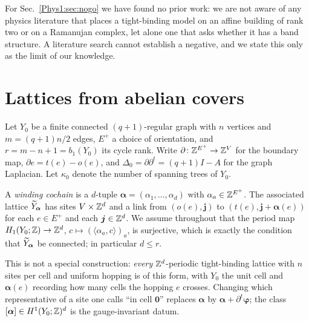 For Sec.~\ref{Phys1:sec:nogo} we have found no prior work: we are not aware of any physics
literature that places a tight-binding model on an affine building of rank two or on a
Ramanujan complex, let alone one that asks whether it has a band structure. A literature
search cannot establish a negative, and we state this only as the limit of our knowledge.

\section{Lattices from abelian covers}\label{Phys1:sec:setup}

Let $Y_0$ be a finite connected $(q{+}1)$-regular graph with $n$ vertices and
$m=(q{+}1)n/2$ edges, $E^{+}$ a choice of orientation, and $r=m-n+1=b_1(Y_0)$ its cycle
rank. Write $\partial\colon\mathbb{Z}^{E^{+}}\to\mathbb{Z}^{V}$ for the boundary map, $\partial
e=t(e)-o(e)$, and $\Delta_0=\partial\partial^{t}=(q{+}1)I-A$ for the graph Laplacian.
Let $\kappa_0$ denote the number of spanning trees of $Y_0$.

\begin{definition}\label{Phys1:def:lattice}
A \emph{winding cochain} is a $d$-tuple $\bm\alpha=(\alpha_1,\dots,\alpha_d)$ with
$\alpha_a\in\mathbb{Z}^{E^{+}}$. The associated lattice $\widetilde Y_{\bm\alpha}$ has sites $V\times\mathbb{Z}^{d}$ and a link
from $(o(e),\bm j)$ to $(t(e),\bm j+\bm\alpha(e))$ for each $e\in E^{+}$ and each
$\bm j\in\mathbb{Z}^{d}$. We assume throughout that the period map
$H_1(Y_0;\mathbb{Z})\to\mathbb{Z}^{d}$, $c\mapsto(\langle\alpha_a,c\rangle)_a$, is surjective, which is
exactly the condition that $\widetilde Y_{\bm\alpha}$ be connected; in particular $d\le r$.
\end{definition}

This is not a special construction: \emph{every} $\mathbb{Z}^{d}$-periodic tight-binding lattice
with $n$ sites per cell and uniform hopping is of this form, with $Y_0$ the unit cell and
$\bm\alpha(e)$ recording how many cells the hopping $e$ crosses. Changing which
representative of a site one calls ``in cell $\bm 0$'' replaces $\bm\alpha$ by
$\bm\alpha+\partial^{t}\bm\varphi$; the class $[\bm\alpha]\in H^{1}(Y_0;\mathbb{Z})^{d}$ is the
gauge-invariant datum.

